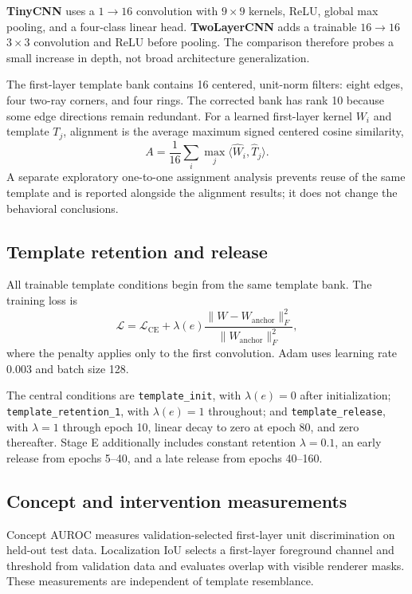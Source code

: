 \documentclass[10pt]{article}
\begin{document}
\textbf{TinyCNN} uses a $1\to16$ convolution with $9\times9$ kernels, ReLU, global max pooling, and a four-class linear head. \textbf{TwoLayerCNN} adds a trainable $16\to16$ $3\times3$ convolution and ReLU before pooling. The comparison therefore probes a small increase in depth, not broad architecture generalization.

The first-layer template bank contains 16 centered, unit-norm filters: eight edges, four two-ray corners, and four rings. The corrected bank has rank 10 because some edge directions remain redundant. For a learned first-layer kernel $W_i$ and template $T_j$, alignment is the average maximum signed centered cosine similarity,
\[
A=\frac{1}{16}\sum_i\max_j\langle \widehat W_i,\widehat T_j\rangle.
\]
A separate exploratory one-to-one assignment analysis prevents reuse of the same template and is reported alongside the alignment results; it does not change the behavioral conclusions.

\subsection{Template retention and release}\label{sec:retention}

All trainable template conditions begin from the same template bank. The training loss is
\[
\mathcal L=\mathcal L_{\mathrm{CE}}+
\lambda(e)\frac{\lVert W-W_{\mathrm{anchor}}\rVert_F^2}
{\lVert W_{\mathrm{anchor}}\rVert_F^2},
\]
where the penalty applies only to the first convolution. Adam uses learning rate 0.003 and batch size 128.

The central conditions are \texttt{template\_init}, with $\lambda(e)=0$ after initialization; \texttt{template\_retention\_1}, with $\lambda(e)=1$ throughout; and \texttt{template\_release}, with $\lambda=1$ through epoch 10, linear decay to zero at epoch 80, and zero thereafter. Stage E additionally includes constant retention $\lambda=0.1$, an early release from epochs 5--40, and a late release from epochs 40--160.

\subsection{Concept and intervention measurements}\label{sec:measurements}

Concept AUROC measures validation-selected first-layer unit discrimination on held-out test data. Localization IoU selects a first-layer foreground channel and threshold from validation data and evaluates overlap with visible renderer masks. These measurements are independent of template resemblance.
\end{document}
